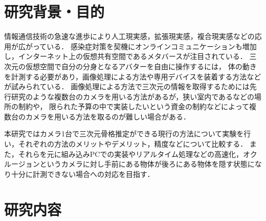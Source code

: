 \documentclass[titlepage]{jarticle}
\begin{document}
\maketitle

%
%
\section{研究背景・目的}
%
情報通信技術の急速な進歩により人工現実感，拡張現実感，複合現実感などの応用が広がっている．
感染症対策を契機にオンラインコミュニケーションも増加し，インターネット上の仮想共有空間であるメタバースが注目されている．
三次元の仮想空間で自分の分身となるアバターを自由に操作するには，
体の動きを計測する必要があり，画像処理による方法\cite{CV}や専用デバイスを装着する方法\cite{キャプチャ}などが試みられている．
画像処理による方法で三次元の情報を取得するためには先行研究のような複数台のカメラを用いる方法\cite{turugi}があるが，狭い室内であるなどの場所の制約や，
限られた予算の中で実装したいという資金の制約などによって複数台のカメラを用いる方法を取るのが難しい場合がある．

本研究ではカメラ1台で三次元骨格推定ができる現行の方法について実験を行い，それぞれの方法のメリットやデメリット，精度などについて比較する．
また，それらを元に組み込みPCでの実装やリアルタイム処理などの高速化，オクルージョンというカメラに対し手前にある物体が後ろにある物体を隠す状態になり十分に計測できない場合への対応を目指す．
%
%
\section{研究内容}

%
%
\end{document}
